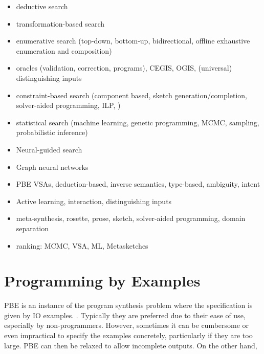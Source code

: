 \begin{itemize}
\item deductive search
\item transformation-based search
\item enumerative search (top-down, bottom-up, bidirectional, offline exhaustive enumeration and composition)
\item oracles (validation, correction, programs), CEGIS, OGIS, (universal) distinguishing inputs
\item constraint-based search (component based, sketch generation/completion, solver-aided programming, ILP, )
\item statistical search (machine learning, genetic programming, MCMC, sampling, probabilistic inference)
\item Neural-guided search
\item Graph neural networks
\item PBE VSAs, deduction-based, inverse semantics, type-based, ambiguity, intent
\item Active learning, interaction, distinguishing inputs
\item meta-synthesis, rosette, prose, sketch, solver-aided programming, domain separation
\item ranking: MCMC, VSA, ML, Metasketches
\end{itemize}

\section{Programming by Examples}
\label{sec:pbe}


 \ac{PBE} is an instance of the program synthesis problem
where the specification is given by \ac{IO} examples.
. Typically they
are preferred due to their ease of use, especially by non-programmers. However,
sometimes it can be cumbersome or even impractical to specify the examples
concretely, particularly if they are too large.  \ac{PBE} can then be relaxed to allow incomplete outputs. On the other
hand, 

